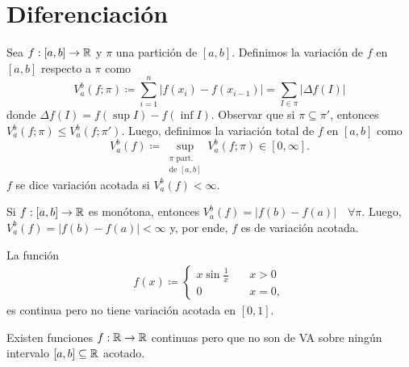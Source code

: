 \chapter{Diferenciación}

\begin{definition}[variación]
	Sea $f : [a,b] \to \mathbb{R}$ y $\pi$ una partición de $[a,b]$. Definimos la variación de $f$ en $[a,b]$ respecto a $\pi$ como
	\[ V_{a}^{b}(f; \pi) \coloneq \sum_{i=1}^{n} |f(x_{i}) - f(x_{i-1})| = \sum_{I \in \pi}^{} |\Delta f(I)| \]
	donde $\Delta f(I) = f(\sup I) - f(\inf I)$. Observar que si $\pi \subseteq \pi'$, entonces $V_{a}^{b}(f;\pi) \leq V_{a}^{b}(f;\pi')$. Luego, definimos la variación total de $f$ en $[a,b]$ como
	\[ V_{a}^{b}(f) \coloneq \sup_{\substack{\pi \text{ part.} \\ \text{de } [a,b]}} V_{a}^{b}(f;\pi) \in [0,\infty]. \]
	$f$ se dice variación acotada si $V_{a}^{b}(f) < \infty$.
\end{definition}

\begin{eg}
	Si $f : [a,b] \to \mathbb{R}$ es monótona, entonces $V_{a}^{b}(f) = |f(b) - f(a)| \quad \forall \pi$. Luego, $V_{a}^{b}(f) = |f(b) - f(a)| < \infty$ y, por ende, $f$ es de variación acotada.
\end{eg}

\begin{eg}
	La función
	\begin{align*}
		f(x) \coloneq \begin{cases}
			x \sin \frac{1}{x} \quad & x > 0 \\
			0 & x = 0,
		\end{cases}
	\end{align*}
	es continua pero no tiene variación acotada en $[0,1]$.
\end{eg}

\begin{remark}
	Existen funciones $f : \mathbb{R} \to \mathbb{R}$ continuas pero que no son de VA sobre ningún intervalo $[a,b] \subseteq \mathbb{R}$ acotado.
\end{remark}

